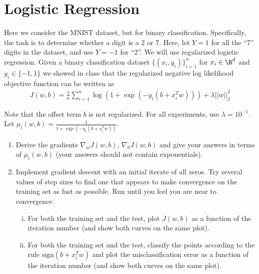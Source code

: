 \documentclass{article}
\begin{document}
\begin{sloppypar}

\section*{Logistic Regression}

\begin{aprob}
    Here we consider the MNIST dataset, but for binary classification. Specifically, the task is to determine whether a digit is a $2$ or $7$.
    Here, let $Y=1$ for all the ``7'' digits in the dataset, and use $Y=-1$ for ``2''.
    We will use regularized logistic regression. 
    Given a binary classification dataset $\{(x_i,y_i)\}_{i=1}^n$ for $x_i \in \R^d$ and $y_i \in \{-1,1\}$ we showed in class that the regularized negative log likelihood objective function can be written as
    \begin{align*}
    J(w,b) = \frac{1}{n} \sum_{i=1}^n \log( 1 + \exp(-y_i (b + x_i^T w))) + \lambda ||w||_2^2
    \end{align*} 

    Note that the offset term $b$ is not regularized. 
    For all experiments, use $\lambda = 10^{-1}$. 
    Let $\mu_i(w,b) = \frac{1}{1+ \exp(-y_i (b + x_i^T w))}$. 
    \begin{enumerate}
        \item {} Derive the gradients $\nabla_w J(w,b)$, $\nabla_{b} J(w,b)$ and give your answers in terms of $\mu_i(w,b)$ (your answers should not contain exponentials).
        \item {} Implement gradient descent with an initial iterate of all zeros. Try several values of step sizes to find one that appears to make convergence on the training set as fast as possible. Run until you feel you are near to convergence.
        \begin{enumerate}[(i)]
            \item For both the training set and the test, plot $J(w,b)$ as a function of the iteration number (and show both curves on the same plot).  
            \item For both the training set and the test, classify the points according to the rule $\text{sign}(b + x_i^T w)$ and plot the misclassification error as a function of the iteration number (and show both curves on the same plot). 
        \end{enumerate}
          

\end{enumerate}
\end{aprob}
\end{sloppypar}
\end{document}
